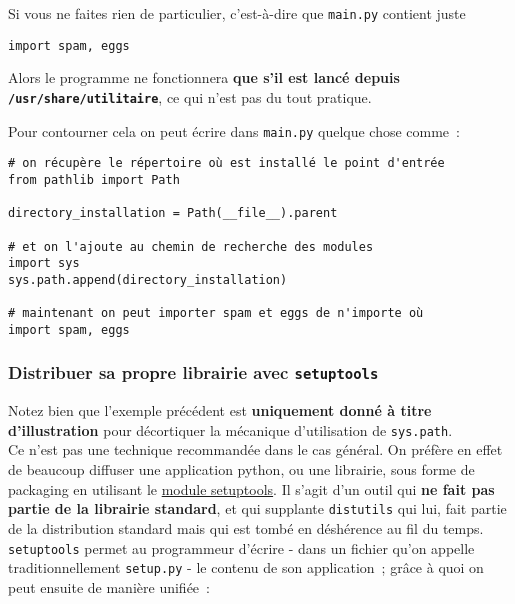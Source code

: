     Si vous ne faites rien de particulier, c'est-à-dire que \texttt{main.py}
contient juste

    \begin{verbatim}
import spam, eggs
\end{verbatim}

    Alors le programme ne fonctionnera \textbf{que s'il est lancé depuis
\texttt{/usr/share/utilitaire}}, ce qui n'est pas du tout pratique.

    Pour contourner cela on peut écrire dans \texttt{main.py} quelque chose
comme~:

    \begin{verbatim}
# on récupère le répertoire où est installé le point d'entrée
from pathlib import Path

directory_installation = Path(__file__).parent

# et on l'ajoute au chemin de recherche des modules
import sys
sys.path.append(directory_installation)

# maintenant on peut importer spam et eggs de n'importe où
import spam, eggs
\end{verbatim}

    \hypertarget{distribuer-sa-propre-librairie-avec-setuptools}{%
\subsubsection{\texorpdfstring{Distribuer sa propre librairie avec
\texttt{setuptools}}{Distribuer sa propre librairie avec setuptools}}\label{distribuer-sa-propre-librairie-avec-setuptools}}

    Notez bien que l'exemple précédent est \textbf{uniquement donné à titre
d'illustration} pour décortiquer la mécanique d'utilisation de
\texttt{sys.path}.\\

Ce n'est pas une technique recommandée dans le cas général. On préfère
en effet de beaucoup diffuser une application python, ou une librairie,
sous forme de packaging en utilisant le
\href{https://pypi.python.org/pypi/setuptools}{module setuptools}. Il
s'agit d'un outil qui \textbf{ne fait pas partie de la librairie
standard}, et qui supplante \texttt{distutils} qui lui, fait partie de
la distribution standard mais qui est tombé en déshérence au fil du
temps.\\

    \texttt{setuptools} permet au programmeur d'écrire - dans un fichier
qu'on appelle traditionnellement \texttt{setup.py} - le contenu de son
application~; grâce à quoi on peut ensuite de manière unifiée~:

